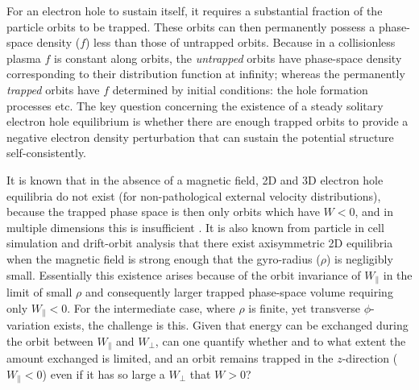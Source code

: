 \documentclass[draft,jgrga]{agutex}
\begin{document}
\begin{article}
For an electron hole to sustain itself, it requires a substantial
fraction of the particle orbits to be trapped. These orbits can then
permanently possess a phase-space density ($f$) less than those of
untrapped orbits. Because in a collisionless plasma $f$ is constant
along orbits, the \emph{untrapped} orbits have phase-space density
corresponding to their distribution function at infinity; whereas the
permanently \emph{trapped} orbits have $f$ determined by initial conditions:
the hole formation processes etc. The key question concerning the
existence of a steady solitary electron hole equilibrium is whether
there are enough trapped orbits to provide a negative electron density
perturbation that can sustain the potential structure
self-consistently.

It is known that in the absence of a magnetic field, 2D and 3D
electron hole equilibria do not exist (for non-pathological external
velocity distributions), because the trapped phase space is then only
orbits which have $W<0$, and in multiple dimensions this is
insufficient \citep{Krasovsky2004,Ng2005,Ng2006}. 
It is also known from particle in cell simulation and
drift-orbit analysis that there exist axisymmetric 2D equilibria when
the magnetic field is strong enough that the gyro-radius ($\rho$) is
negligibly small. Essentially this existence arises because of the
orbit invariance of $W_\parallel$ in the limit of small $\rho$ and
consequently larger trapped phase-space volume requiring only
$W_\parallel <0$.  For the intermediate case, where $\rho$ is finite,
yet transverse $\phi$-variation exists, the challenge is this. Given
that energy can be exchanged during the orbit between $W_\parallel$
and $W_\perp$, can one quantify whether and to what extent the amount
exchanged is limited, and an orbit remains trapped in the
$z$-direction ($W_\parallel<0$) even if it has so large a $W_\perp$
that $W>0$?


\end{article}
\end{document}
